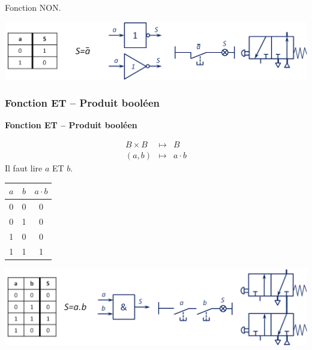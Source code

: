 \documentclass[10pt,fleqn]{article} %
\begin{document}
\begin{exemple}
Fonction NON.


\begin{center}
\includegraphics[width=.9\textwidth]{images/NON}
\end{center}

\end{exemple}


\subsubsection{Fonction ET -- Produit booléen}

\begin{defi}
\textbf{Fonction ET -- Produit booléen}

\begin{minipage}[c]{.45\linewidth}
\begin{eqnarray*}
B \times B &\longmapsto& B\\
(a,b) &\longmapsto& a \cdot b
\end{eqnarray*}
Il faut lire $a$ ET $b$. 
\end{minipage} \hfill
\begin{minipage}[c]{.45\linewidth}
\begin{center}
\begin{tabular}{|c|c||c|}
\hline
$a$ & $b$ & $a\cdot b$ \\
\hline
0 & 0 & 0 \\ \hline
0 & 1 & 0 \\ \hline
1 & 0 & 0 \\ \hline
1 & 1 & 1 \\ \hline
\end{tabular}
\end{center}
\end{minipage}
\end{defi}

\begin{exemple}

\begin{center}
\includegraphics[width=.9\textwidth]{images/ET}
\end{center}

\end{exemple}
\end{document}
